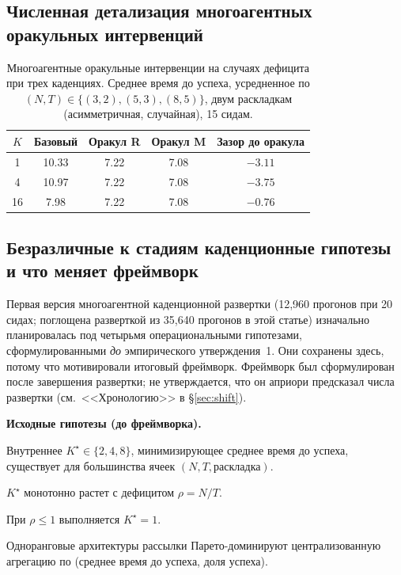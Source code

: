 \documentclass{article}
\begin{document}
\subsection{Численная детализация многоагентных оракульных интервенций}
\label{app:multi-oracle}

\begin{table}[h]
\caption{Многоагентные оракульные интервенции на случаях дефицита при трех каденциях. Среднее время до успеха, усредненное по $(N,T)\in\{(3,2),(5,3),(8,5)\}$, двум раскладкам (асимметричная, случайная), 15 сидам.}
\label{tab:multi-agent-oracle}
\centering
\small
\begin{tabular}{c c c c c}
\toprule
$K$ & Базовый & Оракул R & Оракул M & Зазор до оракула \\
\midrule
1  & 10.33 & 7.22 & 7.08 & $-3.11$ \\
4  & 10.97 & 7.22 & 7.08 & $-3.75$ \\
16 &  7.98 & 7.22 & 7.08 & $-0.76$ \\
\bottomrule
\end{tabular}
\end{table}

\subsection{Безразличные к стадиям каденционные гипотезы и что меняет фреймворк}
\label{app:standalone-hypotheses}

Первая версия многоагентной каденционной развертки (12{,}960 прогонов при 20 сидах; поглощена разверткой из 35{,}640 прогонов в этой статье) изначально планировалась под четырьмя операциональными гипотезами, сформулированными \emph{до} эмпирического утверждения~1. Они сохранены здесь, потому что мотивировали итоговый фреймворк. Фреймворк был сформулирован после завершения развертки; не утверждается, что он априори предсказал числа развертки (см.\ <<Хронологию>> в \S\ref{sec:shift}).

\textbf{Исходные гипотезы (до фреймворка).}
\begin{description}[leftmargin=10pt,topsep=2pt,itemsep=1pt]
\item[H1.] Внутреннее $K^\star \in \{2,4,8\}$, минимизирующее среднее время до успеха, существует для большинства ячеек $(N, T, \text{раскладка})$.
\item[H2.] $K^\star$ монотонно растет с дефицитом $\rho = N/T$.
\item[H3.] При $\rho \le 1$ выполняется $K^\star = 1$.
\item[H4.] Одноранговые архитектуры рассылки Парето-доминируют централизованную агрегацию по (среднее время до успеха, доля успеха).
\end{description}
\end{document}
